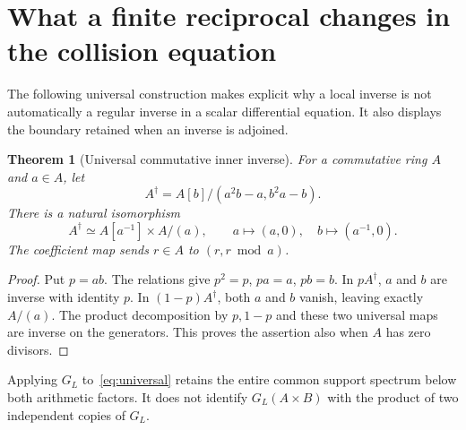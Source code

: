 \documentclass[11pt,a4paper]{article}
\newtheorem{theorem}{Theorem}[section]\newtheorem{proposition}[theorem]{Proposition}\newtheorem{lemma}[theorem]{Lemma}\newtheorem{corollary}[theorem]{Corollary}
\theoremstyle{definition}\newtheorem{definition}[theorem]{Definition}\newtheorem{remark}[theorem]{Remark}
\begin{document}
\section{What a finite reciprocal changes in the collision equation}
The following universal construction makes explicit why a local inverse is not automatically a regular inverse in a scalar differential equation. It also displays the boundary retained when an inverse is adjoined.

\begin{theorem}[Universal commutative inner inverse]
For a commutative ring $A$ and $a\in A$, let
\[
 A^\dagger=A[b]/(a^2b-a,b^2a-b).
\]
There is a natural isomorphism
\begin{equation}
 A^\dagger\simeq A[a^{-1}]\times A/(a),\qquad
 a\mapsto(a,0),\quad b\mapsto(a^{-1},0).                 \label{eq:universal}
\end{equation}
The coefficient map sends $r\in A$ to $(r,r\bmod a)$.
\end{theorem}
\begin{proof}
Put $p=ab$. The relations give $p^2=p$, $pa=a$, $pb=b$. In $pA^\dagger$, $a$ and $b$ are inverse with identity $p$. In $(1-p)A^\dagger$, both $a$ and $b$ vanish, leaving exactly $A/(a)$. The product decomposition by $p,1-p$ and these two universal maps are inverse on the generators. This proves the assertion also when $A$ has zero divisors.
\end{proof}
Applying $G_L$ to~\eqref{eq:universal} retains the entire common support spectrum below both arithmetic factors. It does not identify $G_L(A\times B)$ with the product of two independent copies of $G_L$.
\end{document}
